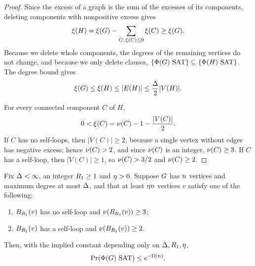 \begin{proof}
Since the excess of a graph is the sum of the excesses of its components,
deleting components with nonpositive excess gives
\[
  \xi(H)
  =\xi(G)-\sum_{C:\,\xi(C)\le0}\xi(C)
  \ge\xi(G).
\]
Because we delete whole components, the degrees of the remaining vertices do
not change, and because we only delete clauses,
\(\{\Phi(G)\text{ SAT}\}\subseteq\{\Phi(H)\text{ SAT}\}\). The degree bound gives
\[
  \xi(G)
  \le\xi(H)
  \le|E(H)|
  \le\frac{\Delta}{2}|V(H)| .
\]

For every connected component \(C\) of \(H\),
\[
  0<\xi(C)
  =\nu(C)-1-\frac{|V(C)|}{2}.
\]
If \(C\) has no self-loops, then \(|V(C)|\ge2\), because a single vertex
without edges has negative excess; hence \(\nu(C)>2\), and since \(\nu(C)\)
is an integer, \(\nu(C)\ge3\). If \(C\) has a self-loop, then \(|V(C)|\ge1\),
so \(\nu(C)>3/2\) and \(\nu(C)\ge2\).
\end{proof}

\begin{packingrestatement}
Fix \(\Delta<\infty\), an integer \(R_1\ge1\) and \(\eta>0\). Suppose \(G\)
has \(n\) vertices and maximum degree at most \(\Delta\), and that at least
\(\eta n\) vertices \(v\) satisfy one of the following:
\begin{enumerate}[label=(\arabic*),leftmargin=3em]
\item \(B_{R_1}(v)\) has no self-loop and \(\nu(B_{R_1}(v))\ge3\);
\item \(B_{R_1}(v)\) has a self-loop and \(\nu(B_{R_1}(v))\ge2\).
\end{enumerate}
Then, with the implied constant depending only on \(\Delta,R_1,\eta\),
\[
  \Prx{\rform{\Gin}\SAT}\le e^{-\Omega(\nvert)} .
\]
\end{packingrestatement}

